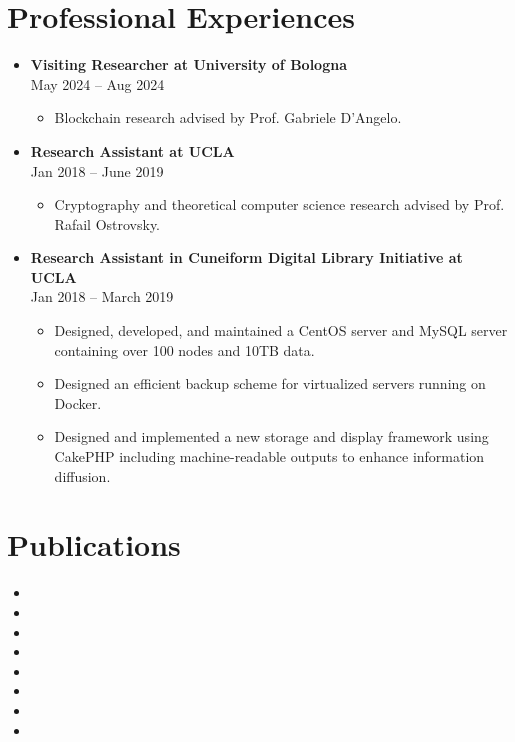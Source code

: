 \documentclass[a4paper,12pt]{article}
\begin{document}
\section*{Professional Experiences}
\begin{itemize}[left=0pt, label={}, noitemsep]
    \item \textbf{Visiting Researcher at University of Bologna} \\
    May 2024 – Aug 2024 
    \begin{itemize}[left=0pt,label=\textbullet,topsep=0pt]
        \item Blockchain research advised by Prof. Gabriele D'Angelo.
    \end{itemize}
    \item \textbf{Research Assistant at UCLA} \\
    Jan 2018 – June 2019
    \begin{itemize}[left=0pt,label=\textbullet,topsep=0pt]
    \item Cryptography and theoretical computer science research advised by Prof. Rafail Ostrovsky.
    \end{itemize}
    \item \textbf{Research Assistant in Cuneiform Digital Library Initiative at UCLA} \\
    Jan 2018 – March 2019
    \begin{itemize}[left=0pt,label=\textbullet,topsep=0pt]
        \item Designed, developed, and maintained a CentOS server and MySQL server containing over 100 nodes and 10TB data. 
        \item Designed an efficient backup scheme for virtualized servers running on Docker. 
        \item Designed and implemented a new storage and display framework using CakePHP including machine-readable outputs to enhance information diffusion. 
    \end{itemize}
\end{itemize}

\section*{Publications}
\begin{itemize}[left=0pt]
    \item {}
    \item {}
    \item {}
    \item {}
    \item {}
    \item {}
    \item {}
    \item {}
\end{itemize}
\end{document}
